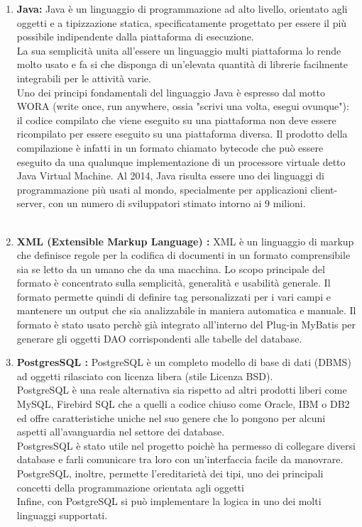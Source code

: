 \begin{enumerate}

\item \textbf{Java: }Java è un linguaggio di programmazione ad alto livello, orientato agli oggetti e a tipizzazione statica, specificatamente progettato per essere il più possibile indipendente dalla piattaforma di esecuzione.\\
La sua semplicità unita all'essere un linguaggio multi piattaforma lo rende molto usato e fa si che disponga di un'elevata quantità di librerie facilmente integrabili per le attività varie.\\
Uno dei principi fondamentali del linguaggio Java è espresso dal motto WORA (write once, run anywhere, ossia "scrivi una volta, esegui ovunque"): il codice compilato che viene eseguito su una piattaforma non deve essere ricompilato per essere eseguito su una piattaforma diversa. Il prodotto della compilazione è infatti in un formato chiamato bytecode che può essere eseguito da una qualunque implementazione di un processore virtuale detto Java Virtual Machine. 
Al 2014, Java risulta essere uno dei linguaggi di programmazione più usati al mondo, specialmente per applicazioni client-server, con un  numero di sviluppatori stimato intorno ai 9 milioni.\\\\

\item \textbf{XML (Extensible Markup Language) : }XML è un linguaggio di markup che definisce regole per la codifica di documenti in un formato comprensibile sia se letto da un umano che da una macchina. Lo scopo principale del formato è concentrato sulla semplicità, generalità e usabilità generale. Il formato permette quindi di definire tag personalizzati per i vari campi e mantenere un output che sia analizzabile in maniera automatica e manuale.
Il formato è stato usato perchè già integrato all'interno del Plug-in MyBatis per generare gli oggetti DAO corrispondenti alle tabelle del database.

\item \textbf{PostgresSQL :}
PostgreSQL è un completo modello di base di dati (\gls{DBMS}) ad oggetti rilasciato con licenza libera (stile Licenza BSD).\\
PostgreSQL è una reale alternativa sia rispetto ad altri prodotti liberi come MySQL, Firebird SQL che a quelli a codice chiuso come Oracle, IBM o DB2 ed offre caratteristiche uniche nel suo genere che lo pongono per alcuni aspetti all'avanguardia nel settore dei database.\\
PostgresSQL è stato utile nel progetto poichè ha permesso di collegare diversi database e farli comunicare tra loro con un'interfaccia facile da manovrare.\\
PostgreSQL, inoltre, permette l'ereditarietà dei tipi, uno dei principali concetti della programmazione orientata agli oggetti\\
Infine, con PostgreSQL si può implementare la logica in uno dei molti linguaggi supportati.


\end{enumerate}
